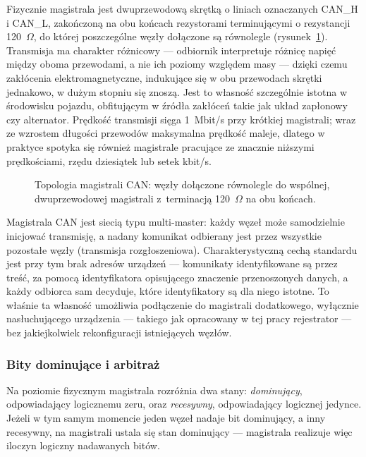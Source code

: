 Fizycznie magistrala jest dwuprzewodową skrętką o liniach oznaczanych
CAN\_H i CAN\_L, zakończoną na obu końcach rezystorami terminującymi
o rezystancji 120~$\Omega$, do której poszczególne węzły dołączone są
równolegle (rysunek~\ref{fig:topologia-can}). Transmisja ma charakter
różnicowy --- odbiornik interpretuje różnicę napięć między oboma
przewodami, a nie ich poziomy względem masy --- dzięki czemu zakłócenia
elektromagnetyczne, indukujące się w obu przewodach skrętki jednakowo,
w dużym stopniu się znoszą. Jest to własność szczególnie istotna
w środowisku pojazdu, obfitującym w źródła zakłóceń takie jak układ
zapłonowy czy alternator. Prędkość transmisji sięga 1~Mbit/s przy krótkiej
magistrali; wraz ze wzrostem długości przewodów maksymalna prędkość maleje,
dlatego w praktyce spotyka się również magistrale pracujące ze znacznie
niższymi prędkościami, rzędu dziesiątek lub setek kbit/s.

\begin{figure}[!h]
    \centering
    \resizebox{0.95\linewidth}{!}{}
    \caption{Topologia magistrali CAN: węzły dołączone równolegle do wspólnej, dwuprzewodowej magistrali z~terminacją 120~$\Omega$ na obu końcach.}
    \label{fig:topologia-can}
\end{figure}

Magistrala CAN jest siecią typu multi-master: każdy węzeł może samodzielnie
inicjować transmisję, a nadany komunikat odbierany jest przez wszystkie
pozostałe węzły (transmisja rozgłoszeniowa). Charakterystyczną cechą
standardu jest przy tym brak adresów urządzeń --- komunikaty identyfikowane
są przez treść, za pomocą identyfikatora opisującego znaczenie przenoszonych
danych, a każdy odbiorca sam decyduje, które identyfikatory są dla niego
istotne. To właśnie ta własność umożliwia podłączenie do magistrali
dodatkowego, wyłącznie nasłuchującego urządzenia --- takiego jak opracowany
w tej pracy rejestrator --- bez jakiejkolwiek rekonfiguracji istniejących
węzłów.

\subsubsection{Bity dominujące i arbitraż}

Na poziomie fizycznym magistrala rozróżnia dwa stany: \emph{dominujący},
odpowiadający logicznemu zeru, oraz \emph{recesywny}, odpowiadający logicznej
jedynce. Jeżeli w tym samym momencie jeden węzeł nadaje bit dominujący,
a inny recesywny, na magistrali ustala się stan dominujący --- magistrala
realizuje więc iloczyn logiczny nadawanych bitów.

